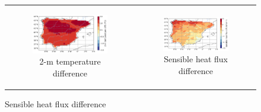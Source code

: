 \begin{figure}[htbp]
    \centering
    \begin{tabular}{cc}
        \begin{subfigure}[b]{0.5\textwidth}
            \caption{2-m temperature difference}
            \includegraphics[width=\textwidth]{images/chap4/future/diffmap_t2m_presfut.png}
        \end{subfigure} &
        \begin{subfigure}[b]{0.5\textwidth}
            \caption{Sensible heat flux difference}
            \includegraphics[width=\textwidth]{images/chap4/future/diffmap_fluxsens_presfut.png}
        \end{subfigure} \\
        

\end{tabular}
\end{figure}
